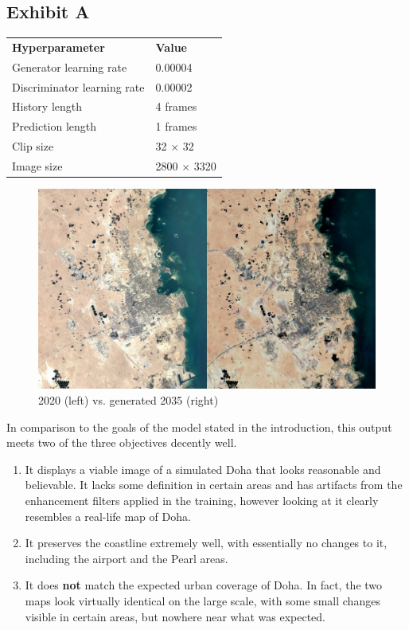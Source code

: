 \documentclass{article}
\begin{document}
\subsection{Exhibit A}

\begin{table}[h]
\begin{tabular}{ll}
\textbf{Hyperparameter} & \textbf{Value}\\
Generator learning rate & 0.00004\\
Discriminator learning rate & 0.00002\\
History length & 4 frames\\
Prediction length & 1 frames\\
Clip size & 32 $\times$ 32\\
Image size & 2800 $\times$ 3320\\
\end{tabular}
\end{table}

\begin{figure}[H]
    \caption{2020 (left) vs. generated 2035 (right)}
    \centering
    \includegraphics[width=0.7\linewidth]{exhibit-a-comp.jpg}
\end{figure}

In comparison to the goals of the model stated in the introduction, this output meets two of the three objectives decently well.

\begin{enumerate}[label=(\alph*)]
    \item It displays a viable image of a simulated Doha that looks reasonable and believable. It lacks some definition in certain areas and has artifacts from the enhancement filters applied in the training, however looking at it clearly resembles a real-life map of Doha.
    \item It preserves the coastline extremely well, with essentially no changes to it, including the airport and the Pearl areas.
    \item It does \textbf{not} match the expected urban coverage of Doha. In fact, the two maps look virtually identical on the large scale, with some small changes visible in certain areas, but nowhere near what was expected.
\end{enumerate}
\end{document}
